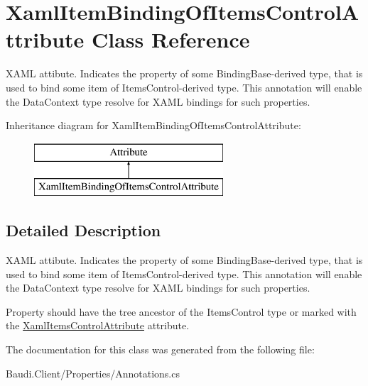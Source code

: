 \hypertarget{class_xaml_item_binding_of_items_control_attribute}{}\section{Xaml\+Item\+Binding\+Of\+Items\+Control\+Attribute Class Reference}
\label{class_xaml_item_binding_of_items_control_attribute}


X\+A\+M\+L attibute. Indicates the property of some {\ttfamily Binding\+Base}-\/derived type, that is used to bind some item of {\ttfamily Items\+Control}-\/derived type. This annotation will enable the {\ttfamily Data\+Context} type resolve for X\+A\+M\+L bindings for such properties.  


Inheritance diagram for Xaml\+Item\+Binding\+Of\+Items\+Control\+Attribute\+:\begin{figure}[H]
\begin{center}
\leavevmode
\includegraphics[height=2.000000cm]{class_xaml_item_binding_of_items_control_attribute}
\end{center}
\end{figure}


\subsection{Detailed Description}
X\+A\+M\+L attibute. Indicates the property of some {\ttfamily Binding\+Base}-\/derived type, that is used to bind some item of {\ttfamily Items\+Control}-\/derived type. This annotation will enable the {\ttfamily Data\+Context} type resolve for X\+A\+M\+L bindings for such properties. 

Property should have the tree ancestor of the {\ttfamily Items\+Control} type or marked with the \hyperlink{class_xaml_items_control_attribute}{Xaml\+Items\+Control\+Attribute} attribute. 

The documentation for this class was generated from the following file\+:\begin{DoxyCompactItemize}
\item 
Baudi.\+Client/\+Properties/Annotations.\+cs\end{DoxyCompactItemize}
